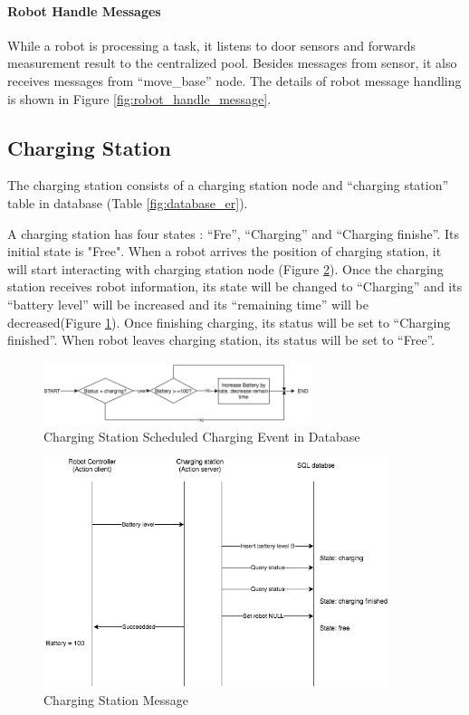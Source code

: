\paragraph{Robot Handle Messages}
While a robot is processing a task, it listens to door sensors and forwards measurement result to the centralized pool. 
Besides messages from sensor, it also receives messages from ``move\_base'' node. The details of robot message handling is shown in Figure \ref{fig:robot_handle_message}.

\subsection{Charging Station}
\label{sec:charging_station}
The charging station consists of a charging station node and ``charging station'' table in database (Table \ref{fig:database_er}). 

A charging station has four states : ``Fre'', ``Charging'' and ``Charging finishe''. Its initial state is "Free". When a robot arrives the position of charging station, it will start interacting with charging station node (Figure \ref{fig:charging_station_message}). 
Once the charging station receives robot information, its state will be changed to ``Charging'' and its ``battery level'' will be increased and its ``remaining time'' will be decreased(Figure \ref{fig:charging_station_event}).  
Once finishing charging, its status will be set to ``Charging finished''. When robot leaves charging station, its status will be set to ``Free''. 

\begin{figure}[htbp]
    \centering
    \includegraphics[width = 0.7\textwidth]{content/images/ch4/charging_station_charging_event.drawio.png}
    \caption{Charging Station Scheduled Charging Event in Database}
    \label{fig:charging_station_event}
\end{figure}

\begin{figure}[htbp]
    \centering
    \includegraphics[width = 0.9\textwidth]{content/images/ch4/charging_station_message.drawio.png}
    \caption{Charging Station Message}
    \label{fig:charging_station_message}
\end{figure}
